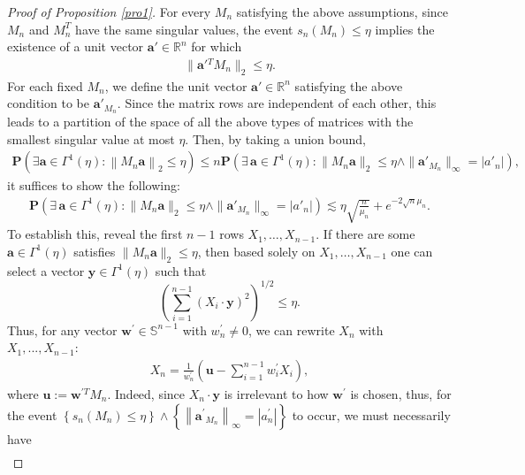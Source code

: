 \documentclass{article}
\numberwithin{equation}{section}
\theoremstyle{plain}
\begin{document}
\begin{proof}[Proof of Proposition \ref{pro1}]
For every $M_n$ satisfying the above assumptions, since $M_n$ and $M_n^T$ have the same singular values, the event $s_n(M_n)\leq\eta$ implies the existence of a unit vector $\boldsymbol a'\in\mathbb R^n$ for which
\begin{align*}
\|\boldsymbol a'{}^T M_n\|_2 \leq\eta.
\end{align*}
For each fixed $M_n$, we define the unit vector $\boldsymbol a'\in\mathbb R^n$ satisfying the above condition to be $\boldsymbol a'_{M_n}$. Since the matrix rows are independent of each other, this leads to a partition of the space of all the above types of matrices with the smallest singular value at most $\eta$. Then, by taking a union bound, 
\begin{align*}
\textbf{P}\left(\exists \boldsymbol{a} \in \Gamma^1(\eta):\left\|M_n \boldsymbol{a}\right\|_2 \leq \eta\right)\leq n \textbf{P}\left(\exists\,\boldsymbol a\in\Gamma^1(\eta):
\|M_n\boldsymbol a\|_2\le\eta \wedge
\|\boldsymbol a'_{M_n}\|_\infty=|a'_n|\right),
\end{align*}
it suffices to show the following:
\begin{align}\label{pro30}
\textbf{P}\left(\exists\,\boldsymbol a\in\Gamma^1(\eta):
\|M_n\boldsymbol a\|_2\le\eta \wedge
\|\boldsymbol a'_{M_n}\|_\infty=|a'_n|\right)
\lesssim\eta\sqrt {\frac{n}{\mu_{n}}} +e^{-2\sqrt n\mu_{n}}.
\end{align}
To establish this, reveal the first \(n-1\) rows \(X_1,\dots,X_{n-1}\).  If there are some $\boldsymbol a\in\Gamma^1(\eta)$ satisfies $\|M_n\boldsymbol a\|_2\le\eta$, then based solely on \(X_1,\dots,X_{n-1}\) one can select a vector \(\boldsymbol y\in\Gamma^1(\eta)\) such that
\[
\left(\sum_{i=1}^{n-1}(X_i\cdot\boldsymbol y)^2\right)^{1/2}
\le\eta.
\]
Thus, for any vector $\boldsymbol{w}^{\prime} \in \mathbb{S}^{n-1}$ with $w_n^{\prime} \neq 0$, we can rewrite $X_n$ with $X_1,...,X_{n-1}$:
\begin{align*}
X_n=\frac{1}{w_n^{\prime}}\left(\boldsymbol{u}-\sum_{i=1}^{n-1} w_i^{\prime} X_i\right),
\end{align*}
where $\boldsymbol{u}:=\boldsymbol{w}^{\prime T} M_n$. Indeed, since $X_n \cdot \boldsymbol{y}$ is irrelevant to how $\boldsymbol{w}^{\prime}$ is chosen,
thus, for the event $\left\{s_n\left(M_n\right) \leq \eta\right\} \wedge\left\{\left\|\boldsymbol{a}^{\prime}{ }_{M_n}\right\|_{\infty}=\left|a_n^{\prime}\right|\right\}$ to occur, we must necessarily have
\begin{align}\label{pro31}

\end{align}
\end{proof}
\end{document}
